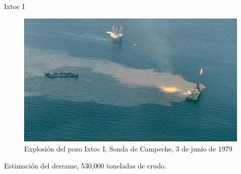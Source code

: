 \begin{frame}{Ixtoc I}    
    \begin{figure}
        \centering
        \includegraphics[scale=0.3]{img/section_01/explosion_ixtoc.jpg}
        \caption{Explosión del pozo Ixtoc I, Sonda de Campeche, 3 de junio de 1979}
        \label{fig:section_01_explosion_ixtoc}
    \end{figure}

    Estimación del derrame, 530,000 toneladas de crudo.
\end{frame}

